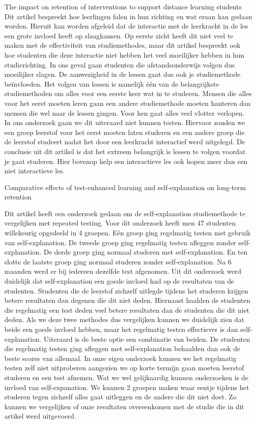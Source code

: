 \documentclass{voorstel}
\begin{document}
	The impact on retention of interventions to support distance learning students \autocite{Simpson2004}
	Dit artikel bespreekt hoe leerlingen falen in hun richting en wat eraan kan gedaan worden. Hieruit kan worden afgeleid dat de interactie met de leerkracht in de les een grote invloed heeft op slaagkansen. Op eerste zicht heeft dit niet veel te maken met de effectiviteit van studiemethodes, maar dit artikel bespreekt ook hoe studenten die deze interactie niet hebben het veel moeilijker hebben in hun studierichting. In ons geval gaan studenten die afstandsonderwijs volgen dus moeilijker slagen. De aanwezigheid in de lessen gaat dus ook je studiemethode beïnvloeden. Het volgen van lessen is namelijk één van de belangrijkste studiemethoden om alles voor een eerste keer wat in te studeren. Mensen die alles voor het eerst moeten leren gaan een andere studiemethode moeten hanteren dan mensen die wel naar de lessen gingen. Voor hen gaat alles veel vlotter verlopen. In ons onderzoek gaan we dit uiteraard niet kunnen testen. Hiervoor zouden we een groep leerstof voor het eerst moeten laten studeren en een andere groep die de leerstof studeert nadat het door een leerkracht interactief werd uitgelegd. De conclusie uit dit artikel is dat het extreem belangrijk is lessen te volgen voordat je gaat studeren. Hier bovenop help een interactieve les ook hopen meer dan een niet interactieve les.
	
	Comparative effects of test-enhanced learning and self-explanation on long-term retention \autocite{LarsenButlerRoediger2013}
	
	Dit artikel heeft een onderzoek gedaan om de self-explanation studiemethode te vergelijken met repeated testing. Voor dit onderzoek heeft men 47 studenten willekeurig opgedeeld in 4 groepen. Eén groep ging regelmatig testen met gebruik van self-explanation. De tweede groep ging regelmatig testen afleggen zonder self-explanation. De derde groep ging normaal studeren met self-explanation. En ten slotte de laatste groep ging normaal studeren zonder self-explanation. Na 6 maanden werd er bij iedereen dezelfde test afgenomen. Uit dit onderzoek werd duidelijk dat self-explanation een goede invloed had op de resultaten van de studenten. Studenten die de leerstof zichzelf uitlegde tijdens het studeren krijgen betere resultaten dan degenen die dit niet deden. Hiernaast haalden de studenten die regelmatig een test deden veel betere resultaten dan de studenten die dit niet deden. Als we deze twee methodes dus vergelijken kunnen we duidelijk zien dat beide een goede invloed hebben, maar het regelmatig testen effectiever is dan self-explanation. Uiteraard is de beste optie een combinatie van beiden. De studenten die regelmatig testen ging afleggen met self-explanation behaalden dan ook de beste scores van allemaal. In onze eigen onderzoek kunnen we het regelmatig testen zelf niet uitproberen aangezien we op korte termijn gaan moeten leerstof studeren en een test afnemen. Wat we wel gelijkaardig kunnen onderzoeken is de invloed van self-expanation. We kunnen 2 groepen maken waar eentje tijdens het studeren tegen zichzelf alles gaat uitleggen en de andere die dit niet doet. Zo kunnen we vergelijken of onze resultaten overeenkomen met de studie die in dit artikel werd uitgevoerd.
	
\end{document}
